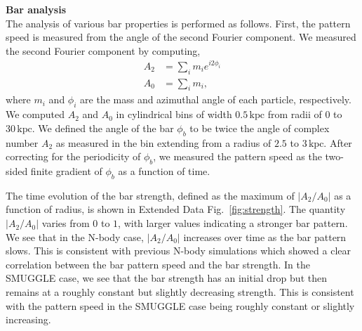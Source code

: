 \documentclass{natureprintstyle}
\begin{document}
\vspace{12pt}

\noindent
{\bf Bar analysis}
\\
\noindent
The analysis of various bar properties is performed as follows. First, the
pattern speed is measured from the angle of the second Fourier component. We measured the second Fourier component by computing,
\begin{equation}
\begin{split}
A_2 &= \sum_i m_i e^{i 2 \phi_i} \\
A_0 &= \sum_i m_i \textrm{,}
\end{split}
\end{equation}
where $m_i$ and $\phi_i$ are the mass and azimuthal angle of each particle, respectively. We
computed $A_2$ and $A_0$ in cylindrical bins of width $0.5\,\textrm{kpc}$ from radii of
$0$ to $30\,\textrm{kpc}$. We defined the angle of the bar $\phi_b$ to be
twice the angle of complex number $A_2$ as measured in the bin extending from
a radius of $2.5$ to $3\,\textrm{kpc}$. After correcting for the periodicity
of $\phi_b$, we measured the pattern speed as the two-sided finite gradient of
$\phi_b$ as a function of time.

The time evolution of the bar strength, defined as the maximum of
$\left|A_2/A_0\right|$ as a function of radius, is shown in Extended Data
Fig.~\ref{fig:strength}. The quantity $\left|A_2/A_0\right|$ varies from $0$
to $1$, with larger values indicating a stronger bar pattern. We see that in
the N-body case, $\left|A_2/A_0\right|$ increases over time as the bar pattern
slows. This is consistent with previous N-body simulations which showed a
clear correlation between the bar pattern speed and the bar
strength.\cite{2003MNRAS.341.1179A} In the SMUGGLE case, we see that the bar
strength has an initial drop but then remains at a roughly constant but
slightly decreasing strength. This is consistent with the pattern speed in the
SMUGGLE case being roughly constant or slightly increasing.
\end{document}
